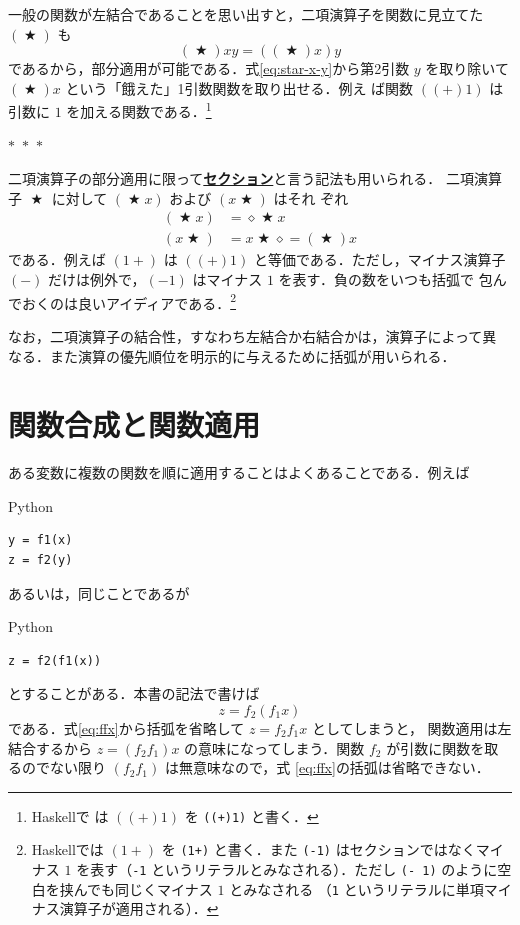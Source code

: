 \documentclass[a5paper,twoside,fleqn,draft]{jsbook}
\newcommand{\separator}{\begin{center}$*$~$*$~$*$\end{center}}
\newcommand{\programminglanguage}[1]{\textsf{#1}}
\newcommand{\haskell}{\programminglanguage{Haskell}}
\newcommand{\python}{\programminglanguage{Python}}
\newcommand{\keyword}[1]{{\underline{\textbf{#1}}}}
\newcommand{\code}[1]{\texttt{#1}}
\newenvironment{pythoncode}{\begin{itembox}[r]{\python}}{\end{itembox}}
\newcommand{\mAnonParam}{\diamond}
\DeclareMathOperator{\mBinOp}{\bigstar}
\begin{document}
一般の関数が左結合であることを思い出すと，二項演算子を関数に見立てた
$(\mBinOp)$ も
\begin{equation}
\label{eq:star-x-y}
(\mBinOp)xy=((\mBinOp)x)y
\end{equation}
であるから，部分適用が可能である．式\eqref{eq:star-x-y}から第2引数 $y$
を取り除いて $(\mBinOp)x$ という「餓えた」1引数関数を取り出せる．例え
ば関数 $((+)1)$ は引数に $1$ を加える関数である．\footnote{\haskell で
は $((+)1)$ を \code{((+)1)} と書く．}

\separator

二項演算子の部分適用に限って\keyword{セクション}と言う記法も用いられる．
二項演算子 $\mBinOp$ に対して $(\mBinOp x)$ および $(x\mBinOp)$ はそれ
ぞれ
\begin{align}
(\mBinOp x)&=\mAnonParam\mBinOp
  x\\ (x\mBinOp)&=x\mBinOp\mAnonParam=(\mBinOp)x
\end{align}
である．例えば $(1+)$ は $((+)1)$ と等価である．ただし，マイナス演算子
$(-)$ だけは例外で，$(-1)$ はマイナス $1$ を表す．負の数をいつも括弧で
包んでおくのは良いアイディアである．\footnote{\haskell では $(1+)$ を
\code{(1+)} と書く．また \code{(-1)} はセクションではなくマイナス
$1$ を表す（\code{-1} というリテラルとみなされる）．ただし \code{(-
1)} のように空白を挟んでも同じくマイナス $1$ とみなされる
（\code{1} というリテラルに単項マイナス演算子が適用される）．}

なお，二項演算子の結合性，すなわち左結合か右結合かは，演算子によって異
なる．また演算の優先順位を明示的に与えるために括弧が用いられる．

\section{関数合成と関数適用}

ある変数に複数の関数を順に適用することはよくあることである．例えば
\begin{pythoncode}
\begin{verbatim}
y = f1(x)
z = f2(y)
\end{verbatim}
\end{pythoncode}
あるいは，同じことであるが
\begin{pythoncode}
\begin{verbatim}
z = f2(f1(x))
\end{verbatim}
\end{pythoncode}
とすることがある．本書の記法で書けば
\begin{equation}
  \label{eq:ffx}
  z=f_2(f_1x)
\end{equation}
である．式\eqref{eq:ffx}から括弧を省略して $z=f_2f_1x$ としてしまうと，
関数適用は左結合するから $z=(f_2f_1)x$ の意味になってしまう．関数
$f_2$ が引数に関数を取るのでない限り $(f_2f_1)$ は無意味なので，式
\eqref{eq:ffx}の括弧は省略できない．
\end{document}

